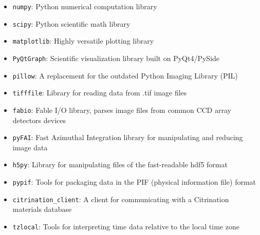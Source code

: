 \begin{itemize}
\item \verb|numpy|: Python numerical computation library
\item \verb|scipy|: Python scientific math library
\item \verb|matplotlib|: Highly versatile plotting library 
\item \verb|PyQtGraph|: Scientific visualization library built on PyQt4/PySide
\item \verb|pillow|: A replacement for the outdated Python Imaging Library (PIL)
\item \verb|tifffile|: Library for reading data from .tif image files 
\item \verb|fabio|: Fable I/O library, parses image files from common CCD array detectors devices
\item \verb|pyFAI|: Fast Azimuthal Integration library for manipulating and reducing image data 
\item \verb|h5py|: Library for manipulating files of the fast-readable hdf5 format
\item \verb|pypif|: Tools for packaging data in the PIF (physical information file) format 
\item \verb|citrination_client|: A client for communicating with a Citrination materials database 
\item \verb|tzlocal|: Tools for interpreting time data relative to the local time zone
\end{itemize}



